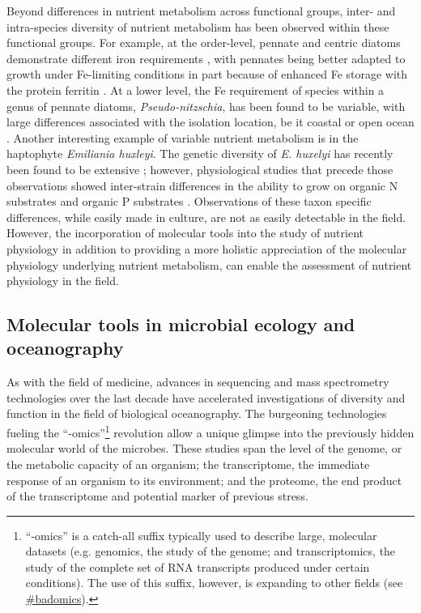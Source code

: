 Beyond differences in nutrient metabolism across functional groups, inter- and intra-species diversity of nutrient metabolism has been observed within these functional groups. For example, at the order-level, pennate and centric diatoms demonstrate different iron requirements \citep{Marchetti2006}, with pennates being better adapted to growth under Fe-limiting conditions in part because of enhanced Fe storage with the protein ferritin \citep{Marchetti2009a}. At a lower level, the Fe requirement of species within a genus of pennate diatoms, \textit{Pseudo-nitzschia}, has been found to be variable, with large differences associated with the isolation location, be it coastal or open ocean \citep{Marchetti2006}. Another interesting example of variable nutrient metabolism is in the haptophyte \textit{Emiliania huxleyi}. The genetic diversity of \textit{E. huxelyi} has recently been found to be extensive \citep{Read2013}; however, physiological studies that precede those observations showed inter-strain differences in the ability to grow on organic N substrates \citep{Strom2009} and organic P substrates \citep{Dyhrman2003}. Observations of these taxon specific differences, while easily made in culture, are not as easily detectable in the field. However, the incorporation of molecular tools into the study of nutrient physiology in addition to providing a more holistic appreciation of the molecular physiology underlying nutrient metabolism, can enable the assessment of nutrient physiology in the field.  

\subsection{Molecular tools in microbial ecology and oceanography}

As with the field of medicine, advances in sequencing and mass spectrometry technologies over the last decade have accelerated investigations of diversity and function in the field of biological oceanography. The burgeoning technologies fueling the ``-omics''\footnote{``-omics'' is a catch-all suffix typically used to describe large, molecular datasets (e.g. genomics, the study of the genome; and transcriptomics, the study of the complete set of RNA transcripts produced under certain conditions). The use of this suffix, however, is expanding to other fields (see \href{https://twitter.com/search?q=\%23badomics&src=typd&lang=en}{\#badomics}).} revolution allow a unique glimpse into the previously hidden molecular world of the microbes. These studies span the level of the genome, or the metabolic capacity of an organism; the transcriptome, the immediate response of an organism to its environment; and the proteome, the end product of the transcriptome and potential marker of previous stress.  \par

